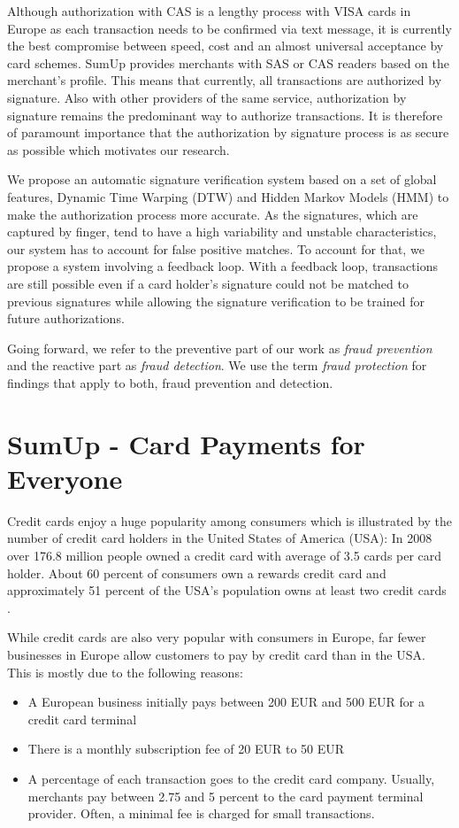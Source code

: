 \documentclass[a4paper, oneside]{csthesis}
\begin{document}
Although authorization with CAS is a lengthy process with VISA cards in Europe as each transaction needs to be confirmed via text message, it is currently the best compromise between speed, cost and an almost universal acceptance by card schemes. SumUp provides merchants with SAS or CAS readers based on the merchant's profile. This means that currently, all transactions are authorized by signature. Also with other providers of the same service, authorization by signature remains the predominant way to authorize transactions. It is therefore of paramount importance that the authorization by signature process is as secure as possible which motivates our research.

We propose an automatic signature verification system based on a set of global features, Dynamic Time Warping (DTW) and Hidden Markov Models (HMM) to make the authorization process more accurate. As the signatures, which are captured by finger, tend to have a high variability and unstable characteristics, our system has to account for false positive matches. To account for that, we propose a system involving a feedback loop. With a feedback loop, transactions are still possible even if a card holder's signature could not be matched to previous signatures while allowing the signature verification to be trained for future authorizations.

Going forward, we refer to the preventive part of our work as \emph{fraud prevention} and the reactive part as \emph{fraud detection}. We use the term \emph{fraud protection} for findings that apply to both, fraud prevention and detection.



\section{SumUp - Card Payments for Everyone}
\label{intro-sumup}

Credit cards enjoy a huge popularity among consumers which is illustrated by the number of credit card holders in the United States of America (USA): In 2008 over 176.8 million people owned a credit card with average of 3.5 cards per card holder. About 60 percent of consumers own a rewards credit card and approximately 51 percent of the USA's population owns at least two credit cards \cite{woolsey2010credit}.

While credit cards are also very popular with consumers in Europe, far fewer businesses in Europe allow customers to pay by credit card than in the USA. This is mostly due to the following reasons:
\begin{itemize}
\item A European business initially pays between 200 EUR and 500 EUR for a credit card terminal
\item There is a monthly subscription fee of 20 EUR to 50 EUR
\item A percentage of each transaction goes to the credit card company. Usually, merchants pay between 2.75 and 5 percent to the card payment terminal provider. Often, a minimal fee is charged for small transactions.
\end{itemize}
\end{document}
